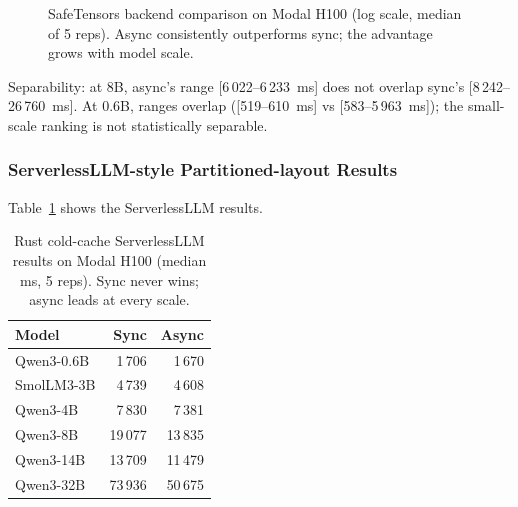 \begin{figure}[htbp]
    \centering
    \caption{SafeTensors backend comparison on Modal H100 (log scale, median of 5 reps). Async consistently outperforms sync; the advantage grows with model scale.}
    \label{fig:safetensors-crossover}
\end{figure}

Separability: at 8B, async's range [6\,022--6\,233~ms] does not overlap sync's [8\,242--26\,760~ms]. At 0.6B, ranges overlap ([519--610~ms] vs [583--5\,963~ms]); the small-scale ranking is not statistically separable.

\subsubsection{ServerlessLLM-style Partitioned-layout Results}

Table~\ref{tab:rust-serverlessllm} shows the ServerlessLLM results.

\begin{table}[htbp]
\caption{Rust cold-cache ServerlessLLM results on Modal H100 (median ms, 5 reps). Sync never wins; async leads at every scale.}
\label{tab:rust-serverlessllm}
\centering
\begin{tabular}{lrr}
\toprule
Model & Sync & Async \\
\midrule
Qwen3-0.6B & 1\,706 & 1\,670 \\
SmolLM3-3B & 4\,739 & 4\,608 \\
Qwen3-4B & 7\,830 & 7\,381 \\
Qwen3-8B & 19\,077 & 13\,835 \\
Qwen3-14B & 13\,709 & 11\,479 \\
Qwen3-32B & 73\,936 & 50\,675 \\
\bottomrule
\end{tabular}
\end{table}

